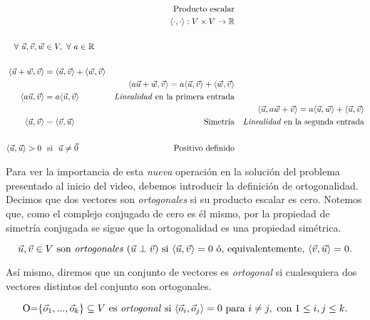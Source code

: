 \documentclass[12pt,dvipsnames]{article}
\numberwithin{equation}{section}
\begin{document}
\begin{align*}
    & &\text{Producto escalar}& &\\
    & &\langle\cdot,\cdot\rangle:V\times V\to \mathbb{R} & &\\
    \\
    \forall \ \vec{u}, \vec{v}, \vec{w}&\in V, \ \forall \ a\in \mathbb{R}\\
    \\
    \langle\vec{u}+\vec{w},\vec{v}\rangle &= \langle \vec{u} , \vec{v} \rangle + \langle \vec{w} , \vec{v} \rangle \\
                                          & &\langle a\vec{u}+\vec{w} , \vec{v} \rangle = a \langle \vec{u} , \vec{v} \rangle + \langle \vec{w} , \vec{v} \rangle\\
    \langle a\vec{u} , \vec{v} \rangle &= a \langle \vec{u} , \vec{v} \rangle &\text{\emph{Linealidad} en la primera entrada} \\
                                       & & & &\langle \vec{u} , a\vec{w}+\vec{v} \rangle = a \langle \vec{u} , \vec{w} \rangle + \langle \vec{u} , \vec{v} \rangle \\
    \langle \vec{u} , \vec{v} \rangle &= \langle \vec{v} , \vec{u} \rangle &\text{Simetría} & &\text{\emph{Linealidad} en la segunda entrada}\\
    \\
    \langle \vec{u}, \vec{u} \rangle > 0 \ &\ \text{si} \ \ \vec{u}\neq\vec{0} &\text{Positivo definido}
\end{align*}

\newpage
Para ver la importancia de esta \emph{nueva} operación en la solución del problema presentado al inicio del video, debemos introducir la definición de ortogonalidad. Decimos que dos vectores son \emph{ortogonales} si su producto escalar es cero. Notemos que, como el complejo conjugado de cero es él mismo, por la propiedad de simetría conjugada se sigue que la ortogonalidad es una propiedad simétrica.

\[
    \vec{u},\vec{v}\in V \ \text{son \emph{ortogonales}} \ (\vec{u}\perp\vec{v}) \ \text{si} \ \langle \vec{u} , \vec{v} \rangle = 0 \ \text{ó, equivalentemente,} \ \langle \vec{v} , \vec{u} \rangle = 0.
\] 

\noindent Así mismo, diremos que un conjunto de vectores es \emph{ortogonal} si cualesquiera dos vectores distintos del conjunto son ortogonales.

\[
    \text{O=}\{\vec{o}_1,...,\vec{o}_k\}\subseteq V \ \text{es \emph{ortogonal} si} \ \langle \vec{o}_i , \vec{o}_j \rangle = 0 \ \text{para} \ i\neq j, \ \text{con} \ 1\le i,j\le k.
\]
\end{document}

